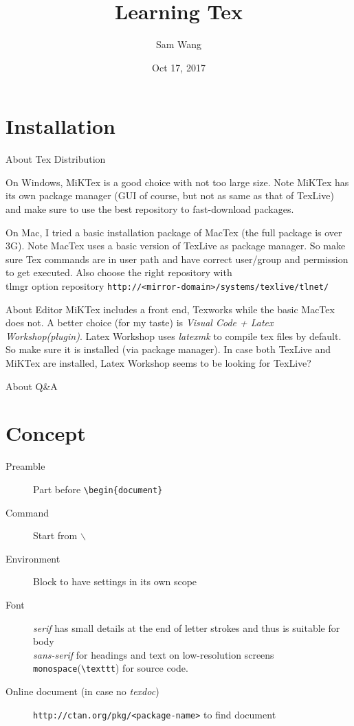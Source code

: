 \documentclass{article}
\title{Learning Tex}
\author{Sam Wang}
\date{Oct 17, 2017}
\newcommand{\site}[2][protocol]{\texttt{#1://#2}}
\begin{document}
\maketitle

\tableofcontents

\section{Installation}
About Tex Distribution

On Windows, MiKTex is a good choice with not too large size. Note MiKTex has its own package manager (GUI of course, but not as same as that of TexLive) and make sure to use the best repository to fast-download packages.

On Mac, I tried a basic installation package of MacTex (the full package is over 3G). Note MacTex uses a basic version of TexLive as package manager. So make sure Tex commands are in user path and have correct user/group and permission to get executed. Also choose the right repository with 
\\tlmgr option repository \site[http]{<mirror-domain>/systems/texlive/tlnet/} 

About Editor
MiKTex includes a front end, Texworks\label{texworks} while the basic MacTex does not. A better choice (for my taste) is \emph{Visual Code + Latex Workshop(plugin)}. Latex Workshop uses \emph{latexmk} to compile tex files by default. So make sure it is installed (via package manager). In case both TexLive and MiKTex are installed, Latex Workshop seems to be looking for TexLive?

About Q\&A \cite{R02}

\section{Concept}
\begin{description}
\item[Preamble]Part before \verb|\begin{document}|
\item[Command]Start from $\backslash$
\item[Environment]Block to have settings in its own scope
\item[Font]\emph{serif} has small details at the end of letter strokes and thus is suitable for body
\\ \emph{sans-serif} for headings and text on low-resolution screens
\\ \texttt{monospace}(\verb|\texttt|) for source code. 
\item[Online document (in case no \emph{texdoc})]\site[http]{ctan.org/pkg/<package-name>} to find document
\end{description}
\end{document}
